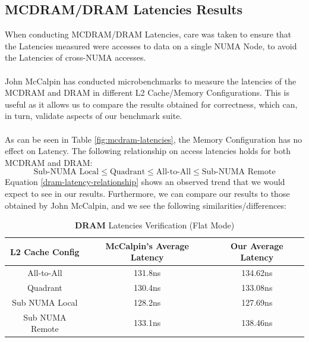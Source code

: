 \documentclass[bsc,frontabs,twoside,singlespacing,parskip,deptreport]{infthesis}     %
\begin{document}
\subsection{MCDRAM/DRAM Latencies Results}
When conducting MCDRAM/DRAM Latencies, care was taken to ensure that the Latencies measured were accesses to data on a single NUMA Node, to avoid the Latencies of cross-NUMA accesses. \\
\\
John McCalpin has conducted microbenchmarks to measure the latencies of the MCDRAM and DRAM in different L2 Cache/Memory Configurations\cite{mccalpin_results}. This is useful as it allows us to compare the results obtained for correctness, which can, in turn, validate aspects of our benchmark suite. \\
\\
As can be seen in Table \ref{fig:mcdram-latencies}, the Memory Configuration has no effect on Latency. The following relationship on access latencies holds for both MCDRAM and DRAM:
\begin{equation}\label{dram-latency-relationship}
\textrm{Sub-NUMA Local} \leq \textrm{Quadrant} \leq \textrm{All-to-All} \leq \textrm{Sub-NUMA Remote}
\end{equation}
Equation \ref{dram-latency-relationship} shows an observed trend that we would expect to see in our results. Furthermore, we can compare our results to those obtained by John McCalpin, and we see the following similarities/differences:

\begin{table}[!h]
\begin{center}
\caption{\textbf{DRAM} Latencies Verification (Flat Mode)}
\label{fig:dram-latencies-verification}
\begin{tabular}{ |c|c|c| } 
    \hline
    L2 Cache Config & McCalpin's Average Latency & Our Average Latency \\
    \hline
    All-to-All      & 131.8ns  & 134.62ns \\
    Quadrant        & 130.4ns  & 133.08ns \\
    Sub NUMA Local  & 128.2ns  & 127.69ns \\
    Sub NUMA Remote & 133.1ns  & 138.46ns \\
    \hline
\end{tabular}
\end{center}
\end{table}
\end{document}
